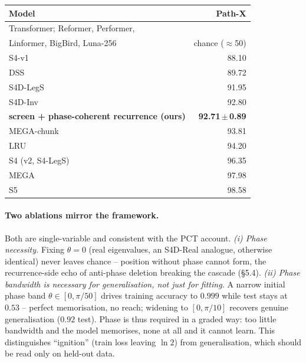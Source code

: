 \documentclass[11pt,a4paper]{article}
\theoremstyle{plain}
\theoremstyle{definition}
\begin{document}
\begin{table}[H]
\centering
\footnotesize
\setlength{\tabcolsep}{6pt}
\renewcommand{\arraystretch}{1.1}
\begin{tabular}{|l|r|}
\hline
Model & Path-X \\
\hline
Transformer; Reformer, Performer, & \\
\;Linformer, BigBird, Luna-256 & chance ($\approx$50) \\
\hline
S4-v1 & 88.10 \\
DSS & 89.72 \\
S4D-LegS & 91.95 \\
S4D-Inv & 92.80 \\
\textbf{screen + phase-coherent recurrence (ours)} & \textbf{92.71\,$\pm$\,0.89} \\
MEGA-chunk & 93.81 \\
LRU & 94.20 \\
S4 (v2, S4-LegS) & 96.35 \\
MEGA & 97.98 \\
S5 & 98.58 \\
\hline
\end{tabular}
\captionsetup{skip=10pt}
\end{table}

\paragraph{Two ablations mirror the framework.}
Both are single-variable and consistent with the PCT account. \emph{(i) Phase
necessity.} Fixing $\theta{=}0$ (real eigenvalues, an S4D-Real analogue,
otherwise identical) never leaves chance -- position without phase cannot form,
the recurrence-side echo of anti-phase deletion breaking the cascade (\S{}5.4).
\emph{(ii) Phase bandwidth is necessary for \emph{generalisation}, not just for
fitting.} A narrow initial phase band $\theta\in[0,\pi/50]$ drives training
accuracy to $0.999$ while test stays at $0.53$ -- perfect memorisation, no reach;
widening to $[0,\pi/10]$ recovers genuine generalisation ($0.92$ test). Phase is
thus required in a graded way: too little bandwidth and the model memorises, none
at all and it cannot learn. This distinguishes ``ignition'' (train loss leaving
$\ln 2$) from generalisation, which should be read only on held-out data.
\end{document}
